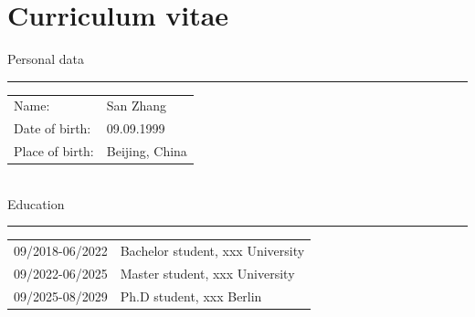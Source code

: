 \documentclass[a4paper,11pt,UTF8,openright]{book}
\begin{document}
\chapter*{Curriculum vitae}

\noindent Personal data

\noindent\rule{\textwidth}{0.4pt}

\vskip 0.1in

\begin{tabular}{p{}p{}}
  Name: & San Zhang \\
  Date of birth: & 09.09.1999 \\
  Place of birth: & Beijing, China \\
\end{tabular} \\

\noindent Education

\noindent\rule{\textwidth}{0.4pt}

\vskip 0.1in

\begin{tabular}{p{}p{}}
  09/2018-06/2022 & Bachelor student, xxx University \\
  09/2022-06/2025 & Master student, xxx University \\
  09/2025-08/2029 & Ph.D student, xxx Berlin \\
\end{tabular} \\
\end{document}
